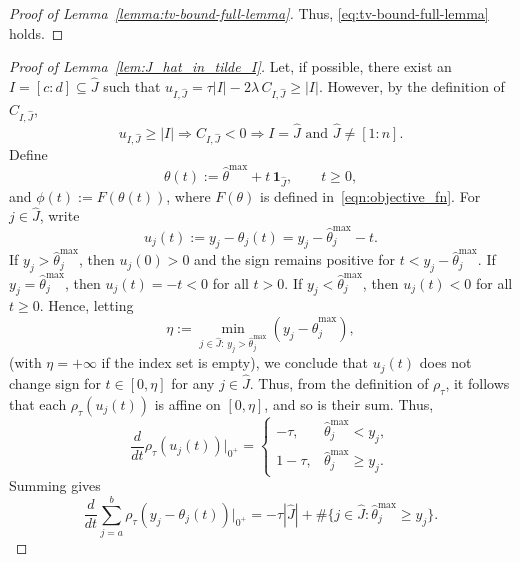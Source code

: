 \documentclass[11pt]{article}
\newcommand{\one}{\mathbf 1}
\theoremstyle{plain}
\theoremstyle{definition}
\theoremstyle{remark}
\begin{document}
\begin{appendix}
\begin{proof}[Proof of Lemma~\ref{lemma:tv-bound-full-lemma}]
Thus, \eqref{eq:tv-bound-full-lemma} holds. 
\end{proof}

\begin{proof}[Proof of Lemma~\ref{lem:J_hat_in_tilde_I}]
    Let, if possible, there exist an $I=[c:d]\subseteq \hat{J}$ such that $u_{I,\hat{J}}=\tau|I|-2\lambda\,C_{I,\hat{J}}\geq |I|$.
    However, by the definition of $C_{I,\hat{J}}$, $$u_{I,\hat{J}}\geq |I| \Rightarrow C_{I,\hat{J}}<0\Rightarrow I=\hat{J} \text{ and } \hat{J}\neq [1:n].$$
    Define
\[
\theta(t):=\hat\theta^{\max}+t\,\one_{\hat{J}},\qquad t\ge 0,
\]
and $\phi(t):=F(\theta(t))$, where $F(\theta)$ is defined in~\eqref{eqn:objective_fn}. For $j\in \hat{J}$, write
\[
u_j(t):=y_j-\theta_j(t)=y_j-\hat\theta^{\max}_j-t.
\]
If $y_j>\hat\theta^{\max}_j$, then $u_j(0)>0$ and the sign remains positive for
$t<y_j-\hat\theta^{\max}_j$.
If $y_j=\hat\theta^{\max}_j$, then $u_j(t)=-t<0$ for all $t>0$.
If $y_j<\hat\theta^{\max}_j$, then $u_j(t)<0$ for all $t\ge 0$.
Hence, letting
\[
\eta:=\min_{j\in \hat{J}:\,y_j>\hat\theta^{\max}_j}
(y_j-\hat\theta^{\max}_j),
\]
(with $\eta=+\infty$ if the index set is empty), we conclude that $u_j(t)$ does not change sign for $t\in [0,\eta]$ for any $j \in \hat{J}.$ Thus, from the definition of $\rho_{\tau}$, it follows that each $\rho_\tau(u_j(t))$ is affine on $[0,\eta]$,
and so is their sum. 
Thus,
\[
\frac{d}{dt}\rho_\tau(u_j(t))\Big|_{0^+}
=
\begin{cases}
-\tau, & \hat\theta^{\max}_j<y_j,\\
1-\tau, & \hat\theta^{\max}_j\ge y_j.
\end{cases}
\]
Summing gives
\begin{equation}\label{eq:data-deriv-full}
\frac{d}{dt}\sum_{j=a}^b \rho_\tau(y_j-\theta_j(t))\Big|_{0^+}
=
-\tau|\hat{J}|+\#\{j\in \hat{J}:\hat\theta^{\max}_j\ge y_j\}.
\end{equation}





\end{proof}
\end{appendix}
\end{document}
